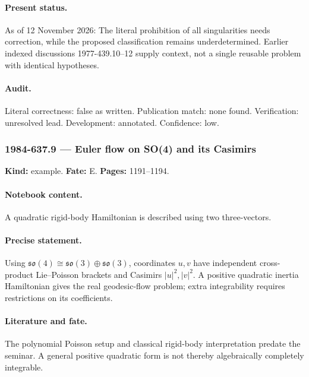 \paragraph{Present status.} As of 12 November 2026: The literal prohibition of all singularities needs correction, while the proposed classification remains underdetermined. Earlier indexed discussions 1977-439.10--12 supply context, not a single reusable problem with identical hypotheses.

\paragraph{Audit.} Literal correctness: false as written. Publication match: none found. Verification: unresolved lead. Development: annotated. Confidence: low.

\subsubsection{1984-637.9 --- Euler flow on SO(4) and its Casimirs}

\label{item:1984-637.9}

\noindent\textbf{Kind:} example. \textbf{Fate:} E. \textbf{Pages:} 1191--1194.\par

\paragraph{Notebook content.} A quadratic rigid-body Hamiltonian is described using two three-vectors.

\paragraph{Precise statement.} Using \(\mathfrak{so}(4)\cong\mathfrak{so}(3)\oplus\mathfrak{so}(3)\), coordinates \(u,v\) have independent cross-product Lie--Poisson brackets and Casimirs \(|u|^2,|v|^2\). A positive quadratic inertia Hamiltonian gives the real geodesic-flow problem; extra integrability requires restrictions on its coefficients.

\paragraph{Literature and fate.} The polynomial Poisson setup and classical rigid-body interpretation predate the seminar. A general positive quadratic form is not thereby algebraically completely integrable.

